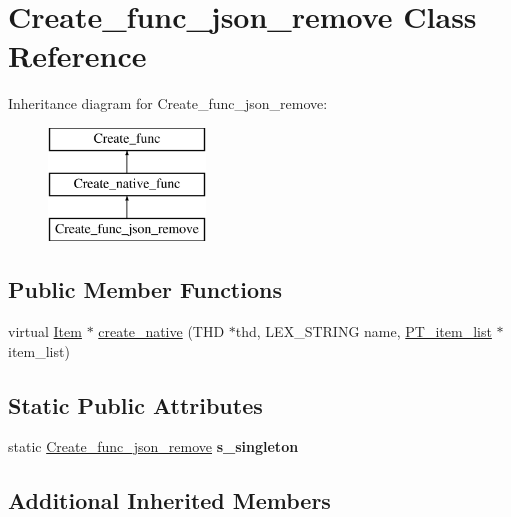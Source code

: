 \hypertarget{classCreate__func__json__remove}{}\section{Create\+\_\+func\+\_\+json\+\_\+remove Class Reference}
\label{classCreate__func__json__remove}
Inheritance diagram for Create\+\_\+func\+\_\+json\+\_\+remove\+:\begin{figure}[H]
\begin{center}
\leavevmode
\includegraphics[height=3.000000cm]{classCreate__func__json__remove}
\end{center}
\end{figure}
\subsection*{Public Member Functions}
\begin{DoxyCompactItemize}
\item 
virtual \mbox{\hyperlink{classItem}{Item}} $\ast$ \mbox{\hyperlink{classCreate__func__json__remove_a6c192ba1efd2ab6a5be04f43396f6919}{create\+\_\+native}} (T\+HD $\ast$thd, L\+E\+X\+\_\+\+S\+T\+R\+I\+NG name, \mbox{\hyperlink{classPT__item__list}{P\+T\+\_\+item\+\_\+list}} $\ast$item\+\_\+list)
\end{DoxyCompactItemize}
\subsection*{Static Public Attributes}
\begin{DoxyCompactItemize}
\item 
\mbox{\label{classCreate__func__json__remove_a7e11dcf3930a760655e91c56d8e35476}} 
static \mbox{\hyperlink{classCreate__func__json__remove}{Create\+\_\+func\+\_\+json\+\_\+remove}} {\bfseries s\+\_\+singleton}
\end{DoxyCompactItemize}
\subsection*{Additional Inherited Members}


